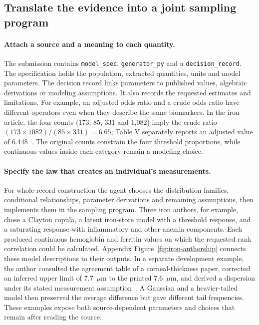 \documentclass[sigconf,anonymous,review]{acmart}
\begin{document}
\subsection{Translate the evidence into a joint sampling program}
\paragraph{Attach a source and a meaning to each quantity.}
The submission contains \texttt{model\_spec}, \texttt{generator\_py} and a \texttt{decision\_record}. The specification holds the population, extracted quantities, units and model parameters. The decision record links parameters to published values, algebraic derivations or modeling assumptions. It also records the requested estimates and limitations. For example, an adjusted odds ratio and a crude odds ratio have different operators even when they describe the same biomarkers. In the iron article, the four counts (173, 85, 331 and 1,082) imply the crude ratio $(173\times1082)/(85\times331)=6.65$; Table V separately reports an adjusted value of 6.448~\cite{zhu}. The original counts constrain the four threshold proportions, while continuous values inside each category remain a modeling choice.

\paragraph{Specify the law that creates an individual's measurements.}
For whole-record construction the agent chooses the distribution families, conditional relationships, parameter derivations and remaining assumptions, then implements them in the sampling program. Three iron authors, for example, chose a Clayton copula, a latent iron-store model with a threshold response, and a saturating response with inflammatory and other-anemia components. Each produced continuous hemoglobin and ferritin values on which the requested rank correlation could be calculated. Appendix Figure~\ref{fig:iron-authorship} connects these model descriptions to their outputs. In a separate development example, the author consulted the agreement table of a corneal-thickness paper, corrected an inferred upper limit of 7.7~$\mu$m to the printed 7.6~$\mu$m, and derived a dispersion under its stated measurement assumption~\cite{hongpachymetry}. A Gaussian and a heavier-tailed model then preserved the average difference but gave different tail frequencies. These examples expose both source-dependent parameters and choices that remain after reading the source.
\end{document}
